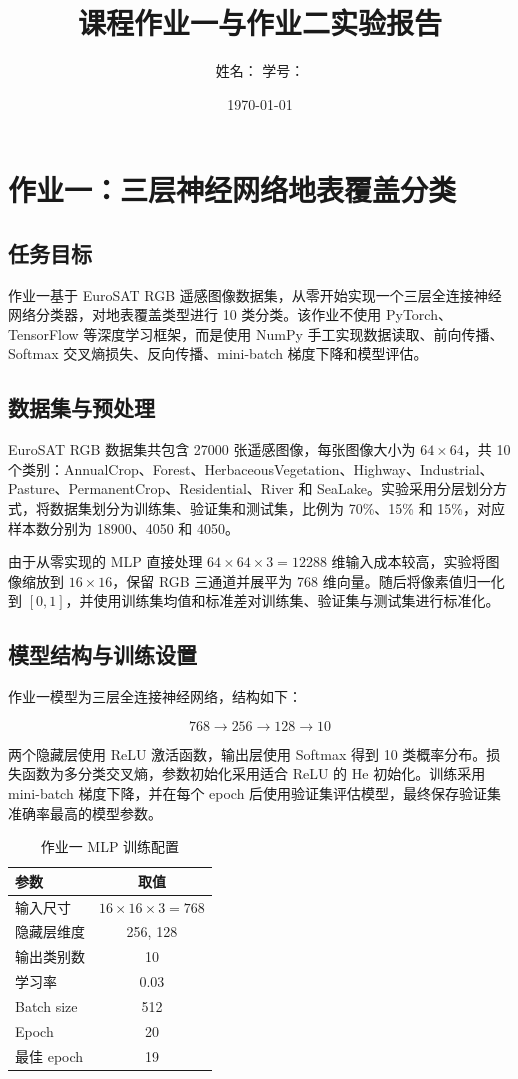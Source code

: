 \documentclass[UTF8,a4paper,12pt]{ctexart}
\title{课程作业一与作业二实验报告}
\author{姓名：\underline{\hspace{4cm}} \quad 学号：\underline{\hspace{4cm}}}
\date{\today}
\begin{document}
\maketitle

\section{作业一：三层神经网络地表覆盖分类}

\subsection{任务目标}

作业一基于 EuroSAT RGB 遥感图像数据集，从零开始实现一个三层全连接神经网络分类器，对地表覆盖类型进行 10 类分类。该作业不使用 PyTorch、TensorFlow 等深度学习框架，而是使用 NumPy 手工实现数据读取、前向传播、Softmax 交叉熵损失、反向传播、mini-batch 梯度下降和模型评估。

\subsection{数据集与预处理}

EuroSAT RGB 数据集共包含 27000 张遥感图像，每张图像大小为 $64\times64$，共 10 个类别：AnnualCrop、Forest、HerbaceousVegetation、Highway、Industrial、Pasture、PermanentCrop、Residential、River 和 SeaLake。实验采用分层划分方式，将数据集划分为训练集、验证集和测试集，比例为 70\%、15\% 和 15\%，对应样本数分别为 18900、4050 和 4050。

由于从零实现的 MLP 直接处理 $64\times64\times3=12288$ 维输入成本较高，实验将图像缩放到 $16\times16$，保留 RGB 三通道并展平为 768 维向量。随后将像素值归一化到 $[0,1]$，并使用训练集均值和标准差对训练集、验证集与测试集进行标准化。

\subsection{模型结构与训练设置}

作业一模型为三层全连接神经网络，结构如下：

\[
768 \rightarrow 256 \rightarrow 128 \rightarrow 10
\]

两个隐藏层使用 ReLU 激活函数，输出层使用 Softmax 得到 10 类概率分布。损失函数为多分类交叉熵，参数初始化采用适合 ReLU 的 He 初始化。训练采用 mini-batch 梯度下降，并在每个 epoch 后使用验证集评估模型，最终保存验证集准确率最高的模型参数。

\begin{table}[H]
\centering
\begin{tabular}{lc}
\toprule
参数 & 取值 \\
\midrule
输入尺寸 & $16\times16\times3=768$ \\
隐藏层维度 & 256, 128 \\
输出类别数 & 10 \\
学习率 & 0.03 \\
Batch size & 512 \\
Epoch & 20 \\
最佳 epoch & 19 \\
\bottomrule
\end{tabular}
\caption{作业一 MLP 训练配置}
\label{tab:hw1_config}
\end{table}
\end{document}
